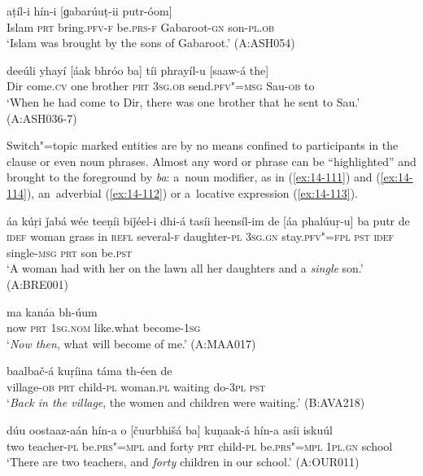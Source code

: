 \begin{exe}
\ex
\label{ex:14-109}
\gll [islaám ba] aṭíl-i hín-i [ɡabarúuṭ-ii putr-óom] \\
Islam \textsc{prt} bring.\textsc{pfv-f} be.\textsc{prs-f} Gabaroot-\textsc{gn} son-\textsc{pl.ob } \\
\glt `Islam was brought by the sons of Gabaroot.' (A:ASH054)

\ex
\label{ex:14-110}
\gll deeúli yhayí [áak bhróo ba] tíi phrayíl-u  [saaw-á the]  \\
Dir come.\textsc{cv} one brother \textsc{prt} \textsc{3sg.ob} send.\textsc{pfv"=msg}  Sau-\textsc{ob} to \\
\glt `When he had come to Dir, there was one brother that he sent to Sau.' (A:ASH036-7)
\end{exe}

Switch"=topic marked entities are by no means confined to participants in the clause or even noun phrases. Almost any word or phrase can be ``highlighted'' and brought to the foreground by \textit{ba}: a~noun modifier, as in (\ref{ex:14-111}) and (\ref{ex:14-114}), an~adverbial (\ref{ex:14-112}) or a~locative expression (\ref{ex:14-113}). 

\begin{exe}
\ex
\label{ex:14-111}
\gll áa kúṛi ǰabá wée teeṇíi biǰéel-i dhi-á  tasíi heensíl-im de
\textsc{[}áa phalúuṛ-u] ba  putr de \\
\textsc{idef} woman grass in \textsc{refl} several-\textsc{f } daughter-\textsc{pl}  \textsc{3sg.gn} stay.\textsc{pfv"=fpl} \textsc{pst} \textsc{idef} single-\textsc{msg} \textsc{prt} son be.\textsc{pst} \\
\glt `A woman had with her on the lawn all her daughters and a \textit{single} son.' (A:BRE001)

\ex
\label{ex:14-112}
\gll [típa ba] ma kanáa bh-úum \\
now \textsc{prt} \textsc{1sg.nom} like.what become-\textsc{1sg } \\
\glt `\textit{Now then}, what will become of me.' (A:MAA017)

\ex
\label{ex:14-113}
\gll [díiš-a ba] baalbač-á kuṛíina táma  th-éen de \\
village-\textsc{ob} \textsc{prt} child-\textsc{pl} woman.\textsc{pl} waiting do-\textsc{3pl} \textsc{pst } \\
\glt `\textit{Back in the village}, the women and children were waiting.' (B:AVA218)

\ex
\label{ex:14-114}
\gll dúu oostaaz-aán hín-a o [čuurbhišá  ba] kuṇaak-á hín-a asíi iskuúl \\
two teacher-\textsc{pl} be.\textsc{prs"=mpl} and forty  \textsc{prt} child-\textsc{pl} be.\textsc{prs"=mpl} \textsc{1pl.gn} school  \\
\glt `There are two teachers, and \textit{forty} children in our school.' (A:OUR011)
\end{exe}

